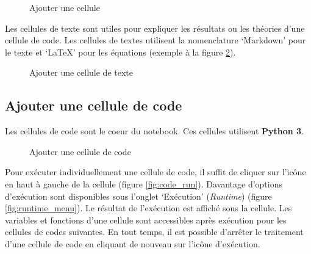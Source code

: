 \documentclass{article}
\begin{document}
\begin{figure}[H]
  \centering
  \caption{Ajouter une cellule}
  \label{fig:add_cell}
\end{figure}

Les cellules de texte sont utiles pour expliquer les résultats ou les théories d'une cellule de code. Les cellules de textes utilisent la nomenclature `Markdown' pour le texte et `LaTeX' pour les équations (exemple à la figure \ref{fig:add_text}).

\begin{figure}[H]
  \centering
  \caption{Ajouter une cellule de texte}
  \label{fig:add_text}
\end{figure}


\subsection{Ajouter une cellule de code}
Les cellules de code sont le coeur du notebook. Ces cellules utilisent \textbf{Python 3}.
\begin{figure}[H]
  \centering
  \caption{Ajouter une cellule de code}
  \label{fig:add_code}
\end{figure}


Pour exécuter individuellement une cellule de code, il suffit de cliquer sur l'icône en haut à gauche de la cellule (figure \ref{fig:code_run}). Davantage d'options d'exécution sont disponibles sous l'onglet `Exécution' (\textit{Runtime}) (figure \ref{fig:runtime_menu}). Le résultat de l'exécution est affiché sous la cellule. Les variables et fonctions d'une cellule sont accessibles après exécution pour les cellules de codes suivantes. En tout temps, il est possible d'arrêter le traitement d'une cellule de code en cliquant de nouveau sur l'icône d'exécution.
\end{document}
